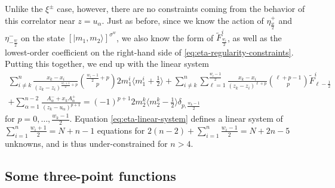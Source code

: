 \documentclass[a4paper,11pt]{article}
\numberwithin{equation}{section}
\begin{document}
Unlike the $\xi^{\pm}$ case, however, there are no constraints coming from the behavior of this correlator near $z=u_{\alpha}$. Just as before, since we know the action of $\eta^+_{\frac{w}{2}}$ and $\eta^-_{-\frac{w}{2}}$ on the state $[|m_1,m_2\rangle]^{\sigma^w}$, we also know the form of $\widetilde{F}^{i}_{\frac{w_i}{2}}$, as well as the lowest-order coefficient on the right-hand side of \eqref{eq:eta-regularity-constraints}. Putting this together, we end up with the linear system
\begin{equation}
\begin{split}
\sum_{i\neq k}^{n}\frac{x_k-x_i}{(z_k-z_i)^{\frac{w_i+1}{2}+p}}\binom{\frac{w_i-1}{2}+p}{p}2m_1^i\bigl\langle m_1^i+\tfrac{1}{2}\bigr\rangle+\sum_{i\neq k}^{n}\sum_{\ell=1}^{\frac{w_i-1}{2}}\frac{x_k-x_i}{(z_k-z_i)^{\ell+p}}\binom{\ell+p-1}{p}\widetilde{F}^i_{\ell-\frac{1}{2}}\\
+\sum_{\alpha=1}^{n-2}\frac{A^-_{\alpha}+x_kA^+_{\alpha}}{(z_k-u_{\alpha})^{p+1}}=(-1)^{p+1}2m_2^k\bigl\langle m_2^k-\tfrac{1}{2}\bigr\rangle\delta_{p,\frac{w_k-1}{2}}
\end{split}
\label{eq:eta-linear-system}
\end{equation}
for $p=0,\ldots,\frac{w_k-1}{2}$. Equation \eqref{eq:eta-linear-system} defines a linear system of $\sum_{i=1}^{n}\frac{w_i+1}{2}=N+n-1$ equations for $2(n-2)+\sum_{i=1}^{n}\frac{w_i-1}{2}=N+2n-5$ unknowns, and is thus under-constrained for $n>4$.

\subsection{Some three-point functions}\label{sec:3pt-111}
\end{document}
